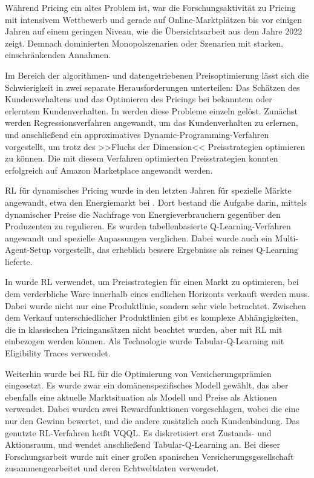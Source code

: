 Während Pricing ein altes Problem ist, war die Forschungsaktivität zu Pricing mit intensivem Wettbewerb und gerade auf Online-Marktplätzen bis vor einigen Jahren auf einem geringen Niveau, wie die Übersichtsarbeit \cite{Gerpott2022} aus dem Jahre 2022 zeigt.
Demnach dominierten Monopolszenarien oder Szenarien mit starken, einschränkenden Annahmen.

Im Bereich der algorithmen- und datengetriebenen Preisoptimierung lässt sich die Schwierigkeit in zwei separate Herausforderungen unterteilen: Das Schätzen des Kundenverhaltens und das Optimieren des Pricings bei bekanntem oder erlerntem Kundenverhalten.
In \cite{10.1145/3219819.3219833} werden diese Probleme einzeln gelöst.
Zunächst werden Regressionsverfahren angewandt, um das Kundenverhalten zu erlernen, und anschließend ein approximatives Dynamic-Programming-Verfahren vorgestellt, um trotz des >>Fluchs der Dimension<< Preisstrategien optimieren zu können.
Die mit diesem Verfahren optimierten Preisstrategien konnten erfolgreich auf Amazon Marketplace angewandt werden.

RL für dynamisches Pricing wurde in den letzten Jahren für spezielle Märkte angewandt, etwa den Energiemarkt bei \cite{Kim2016DynamicPA}.
Dort bestand die Aufgabe darin, mittels dynamischer Preise die Nachfrage von Energieverbrauchern gegenüber den Produzenten zu regulieren.
Es wurden tabellenbasierte Q-Learning-Verfahren angewandt und spezielle Anpassungen verglichen.
Dabei wurde auch ein Multi-Agent-Setup vorgestellt, das erheblich bessere Ergebnisse als reines Q-Learning lieferte.

In \cite{RANA2015426} wurde RL verwendet, um Preisstrategien für einen Markt zu optimieren, bei dem verderbliche Ware innerhalb eines endlichen Horizonts verkauft werden muss.
Dabei wurde nicht nur eine Produktlinie, sondern sehr viele betrachtet.
Zwischen dem Verkauf unterschiedlicher Produktlinien gibt es komplexe Abhängigkeiten, die in klassischen Pricingansätzen nicht beachtet wurden, aber mit RL mit einbezogen werden können.
Als Technologie wurde Tabular-Q-Learning mit Eligibility Traces verwendet.

Weiterhin wurde bei \cite{KRASHENINNIKOVA20198} RL für die Optimierung von Versicherungsprämien eingesetzt.
Es wurde zwar ein domänenspezifisches Modell gewählt, das aber ebenfalls eine aktuelle Marktsituation als Modell und Preise als Aktionen verwendet.
Dabei wurden zwei Rewardfunktionen vorgeschlagen, wobei die eine nur den Gewinn bewertet, und die andere zusätzlich auch Kundenbindung.
Das genutzte RL-Verfahren heißt VQQL.
Es diskretisiert erst Zustands- und Aktionsraum, und wendet anschließend Tabular-Q-Learning an.
Bei dieser Forschungsarbeit wurde mit einer großen spanischen Versicherungsgesellschaft zusammengearbeitet und deren Echtweltdaten verwendet.

